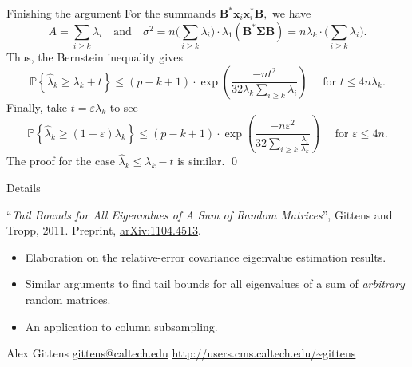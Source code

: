 \documentclass[xcolor={svgnames,pdftex,dvipsnames,table},10pt]{beamer} %
\newcommand{\mat}[1]{\ensuremath{\mathbf{#1}}}
\newcommand{\Prob}[1]{\ensuremath{\mathbb{P}\left\{#1 \right\}}}
\renewcommand{\star}{*}
\begin{document}
\begin{frame}{Finishing the argument}
For the summands $\mat{B}^\star \mat{x}_i \mat{x}_i^\star \mat{B},$ we have
\[A = \sum_{i \geq k} \lambda_i \quad \text{and} \quad \sigma^2 = n \Big(\sum_{i \geq k} \lambda_i \Big) \cdot \lambda_1(\mat{B}^\star \mat{\Sigma} \mat{B}) = n \lambda_k \cdot \Big(\sum_{i \geq k} \lambda_i\Big).
\]
Thus, the Bernstein inequality gives
\[
 \Prob{\hat{\lambda}_k \geq \lambda_k +t} \leq (p-k+1)\cdot \exp\left( \frac{-nt^2}{32\lambda_k \sum_{i \geq k} \lambda_i } \right) \quad \text{ for } t \leq 4n \lambda_k.
\]
Finally, take $t = \varepsilon \lambda_k$ to see
\[
 \Prob{\hat{\lambda}_k \geq (1+\varepsilon) \lambda_k} \leq (p-k+1)\cdot \exp\left( \frac{-n\varepsilon^2}{32\sum_{i \geq k} \frac{\lambda_i}{\lambda_k} } \right) \quad \text{ for } \varepsilon \leq 4n.
\]
The proof for the case $\hat{\lambda}_k \leq \lambda_k - t$ is similar.
\qed
\end{frame}

\begin{frame}{Details}
\begin{description}\itemsep10pt
\item[Paper]
``{\it Tail Bounds for All Eigenvalues of A Sum of Random Matrices}'', Gittens and Tropp, 2011. Preprint, \href{http://arxiv.org/abs/1104.4513}{arXiv:1104.4513}.
\begin{itemize}
\item Elaboration on the relative-error covariance eigenvalue estimation results.
\item Similar arguments to find tail bounds for all eigenvalues of a sum of \emph{arbitrary} random matrices.
\item An application to column subsampling.
\end{itemize}

\item[Contact]
Alex Gittens \newline
\href{mailto:gittens@caltech.edu}{gittens@caltech.edu} \newline
\href{http://users.cms.caltech.edu/~gittens}{\url{http://users.cms.caltech.edu/~gittens}}
\end{description}


\end{frame}
\end{document}
